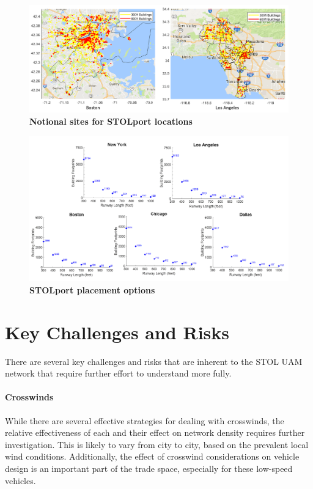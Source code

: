 \documentclass[]{aiaa-tc}%
\begin{document}
\begin{figure}[h!]
	\begin{center}
	\includegraphics[width=1.0\textwidth]{4 Building Heat Maps.pdf}
    \caption{\textbf{Notional sites for STOLport locations}}
	\label{f:heatmap}
	\end{center}
\end{figure}
\begin{figure}[h!]
	\begin{center}
	\includegraphics[width=1.0\textwidth]{5 Building Histograms.pdf}
    \caption{\textbf{STOLport placement options}}
	\label{f:hist}
	\end{center}
\end{figure}

\section{Key Challenges and Risks}
There are several key challenges and risks that are inherent to the STOL UAM network that require further effort to understand more fully.    
\paragraph{Crosswinds} While there are several effective strategies for dealing with crosswinds, the relative effectiveness of each and their effect on network density requires further investigation.  This is likely to vary from city to city, based on the prevalent local wind conditions.  Additionally, the effect of crosswind considerations on vehicle design is an important part of the trade space, especially for these low-speed vehicles.  
\end{document}
